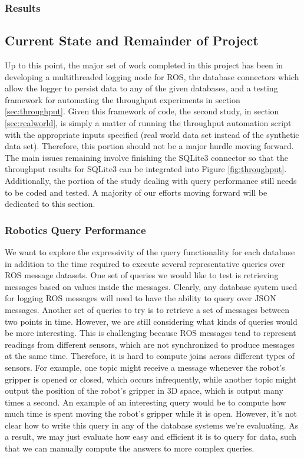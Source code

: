 \documentclass[nocopyrightspace]{acm_proc_article-sp}
\begin{document}
\subsubsection{Results}


\subsection{Current State and Remainder of Project}
Up to this point, the major set of work completed in this project has been in developing a multithreaded logging node for ROS, the database connectors which allow the logger to persist data to any of the given databases, and a testing framework for automating the throughput experiments in section \ref{sec:throughput}. Given this framework of code, the second study, in section \ref{sec:realworld}, is simply a matter of running the throughput automation script with the appropriate inputs specified (real world data set instead of the synthetic data set). Therefore, this portion should not be a major hurdle moving forward. The main issues remaining involve finishing the SQLite3 connector so that the throughput results for SQLite3 can be integrated into Figure \ref{fig:throughput}. Additionally, the portion of the study dealing with query performance still needs to be coded and tested. A majority of our efforts moving forward will be dedicated to this section.

\subsubsection{Robotics Query Performance}
We want to explore the expressivity of the query functionality for each database in addition to the time required to execute several representative queries over ROS message datasets. One set of queries we would like to test is retrieving messages based on values inside the messages. Clearly, any database system used for logging ROS messages will need to have the ability to query over JSON messages. Another set of queries to try is to retrieve a set of messages between two points in time. However, we are still considering what kinds of queries would be more interesting. This is challenging because ROS messages tend to represent readings from different sensors, which are not synchronized to produce messages at the same time. Therefore, it is hard to compute joins across different types of sensors. For example, one topic might receive a message whenever the robot's gripper is opened or closed, which occurs infrequently, while another topic might output the position of the robot's gripper in 3D space, which is output many times a second. An example of an interesting query would be to compute how much time is spent moving the robot's gripper while it is open. However, it's not clear how to write this query in any of the database systems we're evaluating. As a result, we may just evaluate how easy and efficient it is to query for data, such that we can manually compute the answers to more complex queries.







  

\end{document}
